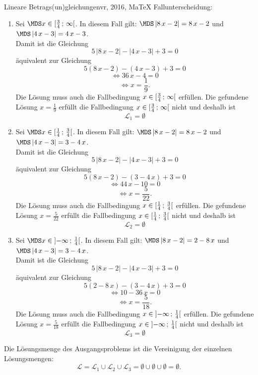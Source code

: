 \begin{MAufgabe}{Lineare Betrags(un)gleichungen}{vr, 2016, MaTeX}
 Fallunterscheidung: 

 \begin{enumerate} 
 \item Sei $ \MDS x\in[ \frac{3}{4} \, \MIntvlSep \, \infty\MoIr $. 
 In diesem Fall gilt: 
  $ \MDS \left| 8\, x - 2\right|=8\, x - 2$ und $ \MDS \left| 4\, x - 3\right|=4\, x - 3$. \\ 
 Damit ist die Gleichung 
 $$ 
5\, \left|8\, x - 2\right| - \left|4\, x - 3\right| + 3= 0
$$
 \"aquivalent zur Gleichung
 $$ 
5\left(8\, x - 2\right)-\left( 4\, x - 3\right)+3= 0 
$$  
$$ 
 \Leftrightarrow 36\, x - 4= 0 
$$  
$$ \Leftrightarrow x = \frac{1}{9} . 
 $$ 
 Die L\"osung muss auch die Fallbedingung $x\in [ \frac{3}{4} \, ; \, \infty[\mbox{}  $ erf\"ullen. Die gefundene L\"osung $x=\frac{1}{9}$ erf\"ullt die Fallbedingung  $x\in [ \frac{3}{4} \, ; \, \infty[\mbox{} $ nicht und deshalb ist  $$
 \mathcal{L}_{1}=\emptyset 
 $$ 
\item Sei $ \MDS x\in[ \frac{1}{4} \, \MIntvlSep \, \frac{3}{4}\MoIr $. 
 In diesem Fall gilt: 
  $ \MDS \left| 8\, x - 2\right|=8\, x - 2$ und $ \MDS \left| 4\, x - 3\right|=3 - 4\, x$. \\ 
 Damit ist die Gleichung 
 $$ 
5\, \left|8\, x - 2\right| - \left|4\, x - 3\right| + 3= 0
$$
 \"aquivalent zur Gleichung
 $$ 
5\left(8\, x - 2\right)-\left( 3 - 4\, x\right)+3= 0 
$$  
$$ 
 \Leftrightarrow 44\, x - 10= 0 
$$  
$$ \Leftrightarrow x = \frac{5}{22} . 
 $$ 
 Die L\"osung muss auch die Fallbedingung $x\in [ \frac{1}{4} \, ; \, \frac{3}{4}[\mbox{}  $ erf\"ullen. Die gefundene L\"osung $x=\frac{5}{22}$ erf\"ullt die Fallbedingung  $x\in [ \frac{1}{4} \, ; \, \frac{3}{4}[\mbox{} $ nicht und deshalb ist  $$
 \mathcal{L}_{2}=\emptyset 
 $$ 
\item Sei $ \MDS x\in\MoIl  -\infty \, \MIntvlSep \, \frac{1}{4}\MoIr $. 
 In diesem Fall gilt: 
  $ \MDS \left| 8\, x - 2\right|=2 - 8\, x$ und $ \MDS \left| 4\, x - 3\right|=3 - 4\, x$. \\ 
 Damit ist die Gleichung 
 $$ 
5\, \left|8\, x - 2\right| - \left|4\, x - 3\right| + 3= 0
$$
 \"aquivalent zur Gleichung
 $$ 
5\left(2 - 8\, x\right)-\left( 3 - 4\, x\right)+3= 0 
$$  
$$ 
 \Leftrightarrow 10 - 36\, x= 0 
$$  
$$ \Leftrightarrow x = \frac{5}{18} . 
 $$ 
 Die L\"osung muss auch die Fallbedingung $x\in \mbox{}]\mathopen{}  -\infty \, ; \, \frac{1}{4}[\mbox{}  $ erf\"ullen. Die gefundene L\"osung $x=\frac{5}{18}$ erf\"ullt die Fallbedingung  $x\in \mbox{}]\mathopen{}  -\infty \, ; \, \frac{1}{4}[\mbox{} $ nicht und deshalb ist  $$
 \mathcal{L}_{3}=\emptyset 
 $$ 
 \end{enumerate} 
  Die L\"osungsmenge des Ausgangsproblems ist die Vereinigung der einzelnen L\"osungsmengen: 
$$ \mathcal{L} = \mathcal{L}_{1} \cup \mathcal{L}_{2} \cup \mathcal{L}_{3} 
 = \emptyset\cup \emptyset\cup \emptyset 
   =\emptyset 
   . $$ 
 

\end{MAufgabe}

